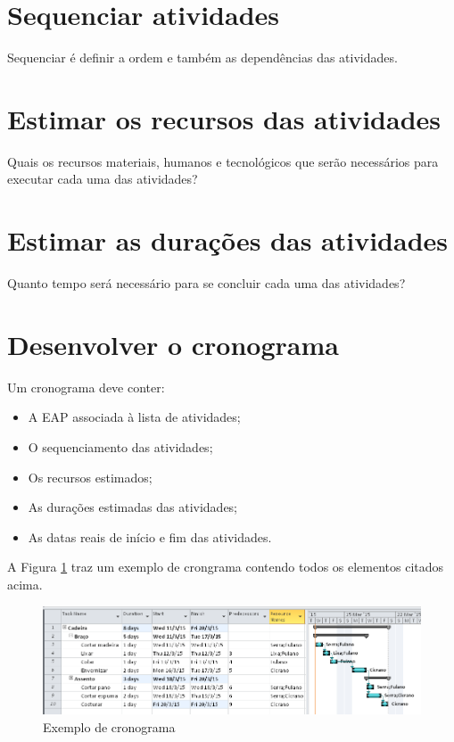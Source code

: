 \section{Sequenciar atividades}

Sequenciar é definir a ordem e também as dependências das atividades.

\section{Estimar os recursos das atividades}

Quais os recursos materiais, humanos e tecnológicos que serão necessários para executar cada uma das atividades?

\section{Estimar as durações das atividades}

Quanto tempo será necessário para se concluir cada uma das atividades?

\section{Desenvolver o cronograma}

Um cronograma deve conter:

\begin{itemize}

\item A EAP associada à lista de atividades;

\item O sequenciamento das atividades;

\item Os recursos estimados;

\item As durações estimadas das atividades;

\item As datas reais de início e fim das atividades.

\end{itemize}

A Figura \ref{fig:ativ:ex} traz um exemplo de crongrama contendo todos os elementos citados acima.

\begin{figure}[!h]
\centering
\includegraphics[scale=0.45]{Figuras/ativ_exemplo.png}
\caption{Exemplo de cronograma}
\label{fig:ativ:ex}
\end{figure}